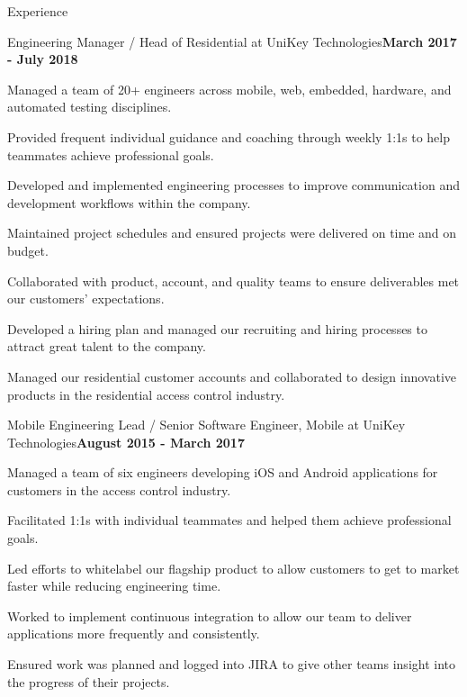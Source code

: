 \documentclass{resume} %
\begin{document}
\begin{rSection}{Experience}


\begin{rSubsection}{Engineering Manager / Head of Residential at UniKey Technologies}{\bf March 2017 - July 2018}{}{}

\item Managed a team of 20+ engineers across mobile, web, embedded, hardware, and automated testing disciplines.
\item Provided frequent individual guidance and coaching through weekly 1:1s to help teammates achieve professional goals.
\item Developed and implemented engineering processes to improve communication and development workflows within the company.
\item Maintained project schedules and ensured projects were delivered on time and on budget.
\item Collaborated with product, account, and quality teams to ensure deliverables met our customers' expectations.
\item Developed a hiring plan and managed our recruiting and hiring processes to attract great talent to the company.
\item Managed our residential customer accounts and collaborated to design innovative products in the residential access control industry.

\end{rSubsection}


\begin{rSubsection}{Mobile Engineering Lead / Senior Software Engineer, Mobile at UniKey Technologies}{\bf August 2015 - March 2017}{}{}

\item Managed a team of six engineers developing iOS and Android applications for customers in the access control industry. 
\item Facilitated 1:1s with individual teammates and helped them achieve professional goals.
\item Led efforts to whitelabel our flagship product to allow customers to get to market faster while reducing engineering time.
\item Worked to implement continuous integration to allow our team to deliver applications more frequently and consistently.
\item Ensured work was planned and logged into JIRA to give other teams insight into the progress of their projects.


\end{rSubsection}
\end{rSection}
\end{document}

